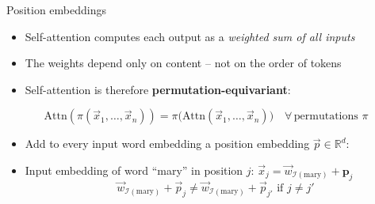 \documentclass[11pt,compress,t,notes=noshow, xcolor=table]{beamer}
\begin{document}
\begin{frame}{Position embeddings}

\vfill

\begin{itemize}
\item Self-attention computes each output as a \textit{weighted sum of all inputs}
\item The weights depend only on content -- not on the order of tokens
\item Self-attention is therefore \textbf{permutation-equivariant}:
\end{itemize}

\begin{equation*}
\text{Attn}(\pi(\vec x_1, \ldots, \vec x_n)) = \pi\big(\text{Attn}(\vec x_1, \ldots, \vec x_n)\big)
\quad \forall\, \text{permutations } \pi
\end{equation*}

\begin{itemize}
\item Add to every input word embedding a position embedding $\vec {p} \in \mathbb{R}^d$:
\item Input embedding of word ``mary'' in position $j$: $\vec {x}_j = \vec {w}_{\mathcal{I}(\text{mary})} + \mathbf{p}_j$
$$\vec {w}_{\mathcal{I}(\text{mary})} + \vec {p}_j \neq \vec{w}_{\mathcal{I}(\text{mary})} + \vec {p}_{j'} \text{ if } j \neq j'$$

\end{itemize}

\vfill

\end{frame}

\end{document}
